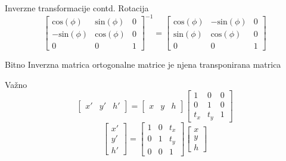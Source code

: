\documentclass[9pt]{beamer}
\begin{document}
\begin{frame}{Inverzne transformacije contd.}
	Rotacija
	\[  \left[ \begin{array}{ccc}
	\text{cos}(\phi) & \text{sin}(\phi) & 0 \\
	-\text{sin}(\phi) & \text{cos}(\phi) & 0 \\
	0 & 0 & 1 
	\end{array} \right] ^{-1} = 
	\left[ \begin{array}{ccc}
	\text{cos}(\phi) & -\text{sin}(\phi) & 0 \\
	\text{sin}(\phi) & \text{cos}(\phi) & 0 \\
	0 & 0 & 1 
	\end{array} \right]\]
	\begin{block}{Bitno}
		Inverzna matrica ortogonalne matrice je njena transponirana matrica
	\end{block}
\end{frame}

\begin{frame}{Važno}
	\[ \left[ \begin{array}{ccc} x' & y' & h'  \end{array} \right] = 
	\left[ \begin{array}{ccc} x & y & h \end{array} \right] 
	\left[ \begin{array}{ccc}
	1 & 0 & 0 \\
	0 & 1 & 0 \\
	t_{x} & t_{y} & 1 
	\end{array} \right]  \]
	\[ \left[ \begin{array}{c} x' \\ y' \\ h'  \end{array} \right] =     
	\left[ \begin{array}{ccc}
	1 & 0 & t_{x} \\
	0 & 1 & t_{y} \\
	0 & 0 & 1 
	\end{array} \right]
	\left[ \begin{array}{c} x \\ y \\ h \end{array} \right] 
	\]
\end{frame}
\end{document}
